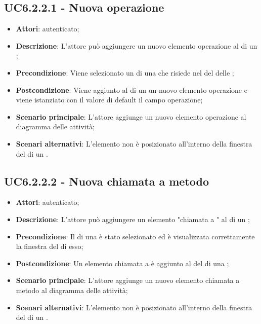 \subsection{UC6.2.2.1 - Nuova operazione}
\label{ssec:UC6.2.2.1}
\begin{itemize}
\item \textbf{Attori}:  autenticato;
\item \textbf{Descrizione}: L'attore può aggiungere un nuovo elemento operazione al  di un ;
\item \textbf{Precondizione}: Viene selezionato un  di una  che risiede nel  del  delle  ;
\item \textbf{Postcondizione}: Viene aggiunto al  di un  un nuovo elemento operazione e viene istanziato con il valore di default il campo operazione;
\item \textbf{Scenario principale}: L'attore aggiunge un nuovo elemento operazione al diagramma delle attività;
\item \textbf{Scenari alternativi}: L'elemento non è posizionato all'interno della finestra del  di un .
\end{itemize}
\subsection{UC6.2.2.2 - Nuova chiamata a metodo}
\label{ssec:UC6.2.2.2}
\begin{itemize}
\item \textbf{Attori}:  autenticato;
\item \textbf{Descrizione}: L'attore può aggiungere un elemento "chiamata a " al  di un ;
\item \textbf{Precondizione}: Il  di una  è stato selezionato ed è visualizzata correttamente la finestra del  di esso;
\item \textbf{Postcondizione}: Un elemento chiamata a  è aggiunto al  del  di una ;
\item \textbf{Scenario principale}: L'attore aggiunge un nuovo elemento chiamata a metodo al diagramma delle attività;
\item \textbf{Scenari alternativi}: L'elemento non è posizionato all'interno della finestra del  di un .
\end{itemize}
